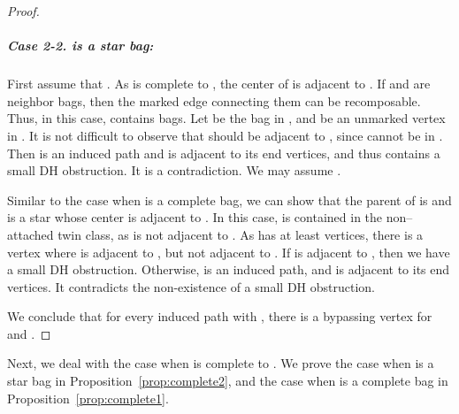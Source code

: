 \documentclass[11pt]{elsarticle}
\begin{document}
\begin{proof}
\subparagraph{\textbf{Case 2-2.}  is a star bag:}
First assume that . 
As  is complete to , the center of  is adjacent to .
If  and  are neighbor bags, then the marked edge connecting them can be recomposable.
Thus, in this case,  contains  bags. Let  be the bag in , and  be an unmarked vertex in .
It is not difficult to observe that  should be adjacent to , since  cannot be in .
Then  is an induced path and  is adjacent to its end vertices, and thus  contains a small DH obstruction.
It is a contradiction. We may assume .


Similar to the case when  is a complete bag, we can show that the parent of  is  and  is a star whose center is adjacent to .
In this case,  is contained in the non--attached twin class, as  is not adjacent to .
As  has at least  vertices, there is a vertex  where  is adjacent to , but not adjacent to .
If  is adjacent to , then we have a small DH obstruction.
Otherwise,  is an induced path, and  is adjacent to its end vertices. 
It contradicts the non-existence of a small DH obstruction.

\medskip
We conclude that for every induced path  with , 
  there is a bypassing vertex for  and .
\end{proof}

Next, we deal with the case when  is complete to . We prove the case when  is a star bag in Proposition~\ref{prop:complete2}, 
and the case when  is a complete bag in Proposition~\ref{prop:complete1}. 
\end{document}
